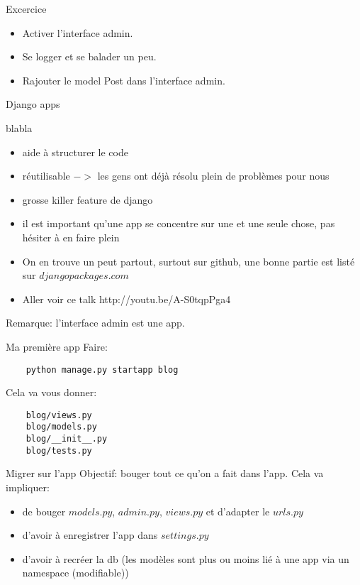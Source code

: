 \documentclass{beamer}
\begin{document}
\begin{frame}[fragile]{Excercice}
    \begin{itemize}
        \item Activer l'interface admin.
        \item Se logger et se balader un peu.
        \item Rajouter le model Post dans l'interface admin.
    \end{itemize}
\end{frame}

\begin{frame}[fragile]{}
\begin{LARGE}
\begin{center}
Django apps
\end{center}
\end{LARGE}
\end{frame}

\begin{frame}[fragile]{blabla}
    \begin{itemize}
        \item aide à structurer le code\pause
        \item réutilisable $->$ les gens ont déjà résolu plein de problèmes pour nous\pause
        \item grosse killer feature de django\pause
        \item il est important qu'une app se concentre sur une et une seule chose, pas hésiter à en faire plein\pause
        \item On en trouve un peut partout, surtout sur github, une bonne partie est listé sur $djangopackages.com$\pause
        \item Aller voir ce talk http://youtu.be/A-S0tqpPga4\pause
    \end{itemize}
    Remarque: l'interface admin est une app.
\end{frame}

\begin{frame}[fragile]{Ma première app}
    Faire:
\begin{verbatim}
    python manage.py startapp blog
\end{verbatim}
\pause

    Cela va vous donner:
\begin{verbatim}
    blog/views.py
    blog/models.py
    blog/__init__.py
    blog/tests.py
\end{verbatim}
\end{frame}

\begin{frame}[fragile]{Migrer sur l'app}
    Objectif: bouger tout ce qu'on a fait dans l'app. Cela va impliquer:
    \begin{itemize}
        \item de bouger $models.py$, $admin.py$, $views.py$ et d'adapter le $urls.py$
        \item d'avoir à enregistrer l'app dans $settings.py$
        \item d'avoir à recréer la db (les modèles sont plus ou moins lié à une app via un namespace (modifiable))
    \end{itemize}
\end{frame}
\end{document}
